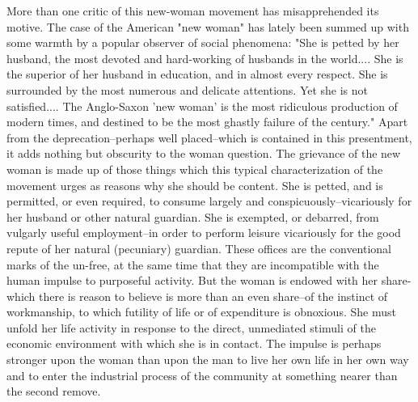 \documentclass[12pt]{report}
\begin{document}
More than one critic of this new-woman movement has misapprehended its
motive. The case of the American "new woman" has lately been summed
up with some warmth by a popular observer of social phenomena: "She is
petted by her husband, the most devoted and hard-working of husbands in
the world.... She is the superior of her husband in education, and
in almost every respect. She is surrounded by the most numerous and
delicate attentions. Yet she is not satisfied.... The Anglo-Saxon 'new
woman' is the most ridiculous production of modern times, and destined
to be the most ghastly failure of the century." Apart from the
deprecation--perhaps well placed--which is contained in this
presentment, it adds nothing but obscurity to the woman question. The
grievance of the new woman is made up of those things which this typical
characterization of the movement urges as reasons why she should be
content. She is petted, and is permitted, or even required, to consume
largely and conspicuously--vicariously for her husband or other
natural guardian. She is exempted, or debarred, from vulgarly useful
employment--in order to perform leisure vicariously for the good repute
of her natural (pecuniary) guardian. These offices are the conventional
marks of the un-free, at the same time that they are incompatible with
the human impulse to purposeful activity. But the woman is endowed
with her share-which there is reason to believe is more than an even
share--of the instinct of workmanship, to which futility of life or of
expenditure is obnoxious. She must unfold her life activity in response
to the direct, unmediated stimuli of the economic environment with which
she is in contact. The impulse is perhaps stronger upon the woman
than upon the man to live her own life in her own way and to enter the
industrial process of the community at something nearer than the second
remove.
\end{document}
